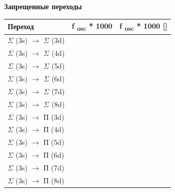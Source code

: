 \bigskip

{\centering
\textbf{Запрещенные
переходы}
\par}

\begin{flushleft}
\tablefirsthead{}
\tablehead{}
\tabletail{}
\tablelasttail{}
\begin{supertabular}{|m{4.9560003cm}|m{5.806cm}|m{4.176cm}|}
\hline
\textbf{{Переход}} &
\textbf{{f }}\textbf{{\textsubscript{osc}}}\textbf{{ * 1000}} &
\textbf{{f }}\textbf{{\textsubscript{osc}}}\textbf{{ * 1000
[]}}\\\hline
{$\Sigma $ (3s) $\rightarrow $ $\Sigma $ (3d)} &
 &
\raggedleft{}\\
{$\Sigma $ (3s) $\rightarrow $ $\Sigma $ (4d)} &
 &
\raggedleft{}\\
{$\Sigma $ (3s) $\rightarrow $ $\Sigma $ (5d)} &
 &
\raggedleft{}\\
{$\Sigma $ (3s) $\rightarrow $ $\Sigma $ (6d)} &
 &
\raggedleft{}\\
{$\Sigma $ (3s) $\rightarrow $ $\Sigma $ (7d)} &
 &
\raggedleft{}\\
{$\Sigma $ (3s) $\rightarrow $ $\Sigma $ (8d)} &
 &
\raggedleft{}\\\hline
{$\Sigma $ (3s) $\rightarrow $ П (3d)} &
 &
\raggedleft{}\\
{$\Sigma $ (3s) $\rightarrow $ П (4d)} &
 &
\raggedleft{}\\
{$\Sigma $ (3s) $\rightarrow $ П (5d)} &
 &
\raggedleft{}\\
{$\Sigma $ (3s) $\rightarrow $ П (6d)} &
 &
\raggedleft{}\\
{$\Sigma $ (3s) $\rightarrow $ П (7d)} &
 &
\raggedleft{}\\
{$\Sigma $ (3s) $\rightarrow $ П (8d)} &
 &
\raggedleft{}\\\hline
\end{supertabular}
\end{flushleft}

